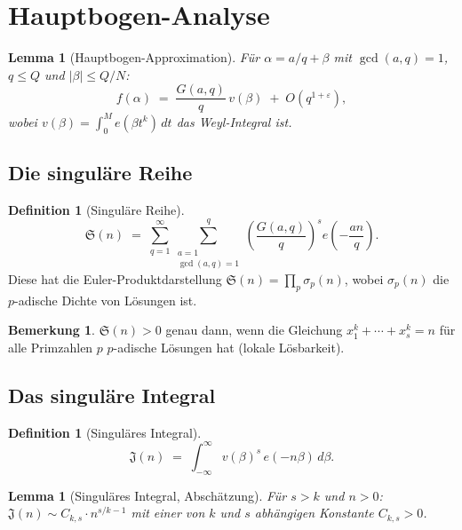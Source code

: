 \documentclass[12pt,a4paper]{amsart}
\newtheorem{lemma}[theorem]{Lemma}
\theoremstyle{definition}
\newtheorem{definition}[theorem]{Definition}
\newtheorem{bemerkung}[theorem]{Bemerkung}
\newcommand{\eq}[1]{e\!\left(#1\right)}
\begin{document}
\section{Hauptbogen-Analyse}
\label{sec:hauptbogen}

\begin{lemma}[Hauptbogen-Approximation]\label{lem:hauptapprox}
  Für $\alpha = a/q + \beta$ mit $\gcd(a,q)=1$, $q \leq Q$ und
  $|\beta| \leq Q/N$:
  \[
    f(\alpha) \;=\; \frac{G(a, q)}{q}\, v(\beta) \;+\; O\!\left(q^{1+\varepsilon}\right),
  \]
  wobei $v(\beta) = \int_0^M \eq{\beta t^k}\, dt$ das \emph{Weyl-Integral} ist.
\end{lemma}

\subsection{Die singuläre Reihe}

\begin{definition}[Singuläre Reihe]\label{def:sing_reihe}
  \[
    \mathfrak{S}(n) \;=\; \sum_{q=1}^{\infty} \sum_{\substack{a=1\\ \gcd(a,q)=1}}^{q}
                          \left(\frac{G(a,q)}{q}\right)^s \eq{-\frac{an}{q}}.
  \]
  Diese hat die Euler-Produktdarstellung
  $\mathfrak{S}(n) = \prod_p \sigma_p(n)$,
  wobei $\sigma_p(n)$ die $p$-adische Dichte von Lösungen ist.
\end{definition}

\begin{bemerkung}
  $\mathfrak{S}(n) > 0$ genau dann, wenn die Gleichung
  $x_1^k + \cdots + x_s^k = n$ für alle Primzahlen $p$ $p$-adische
  Lösungen hat (lokale Lösbarkeit).
\end{bemerkung}

\subsection{Das singuläre Integral}

\begin{definition}[Singuläres Integral]
  \[
    \mathfrak{J}(n) \;=\; \int_{-\infty}^{\infty} v(\beta)^s\, \eq{-n\beta}\, d\beta.
  \]
\end{definition}

\begin{lemma}[Singuläres Integral, Abschätzung]\label{lem:sing_int}
  Für $s > k$ und $n > 0$:
  $\mathfrak{J}(n) \sim C_{k,s} \cdot n^{s/k - 1}$
  mit einer von $k$ und $s$ abhängigen Konstante $C_{k,s} > 0$.
\end{lemma}
\end{document}
